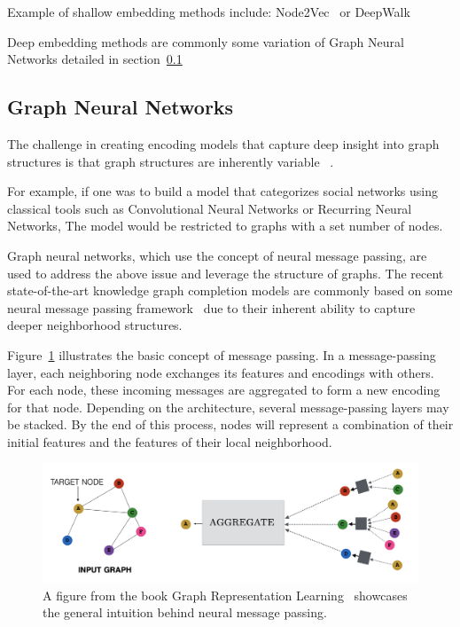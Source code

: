 Example of shallow embedding methods include: Node2Vec~\cite{Node2vec} or DeepWalk~\cite{DeepWalk}

Deep embedding methods are commonly some variation of Graph Neural Networks detailed in section~\ref{subsec:introduction-graph-neural-networks}

\subsection{Graph Neural Networks}\label{subsec:introduction-graph-neural-networks}
The challenge in creating encoding models that capture deep insight into graph structures is that graph structures are inherently variable ~\cite{GRLBook}.

For example, if one was to build a model that categorizes social networks using classical tools such as Convolutional Neural Networks or Recurring Neural Networks,
The model would be restricted to graphs with a set number of nodes.

Graph neural networks, which use the concept of neural message passing, are used to address the above issue and leverage the structure of graphs.
The recent state-of-the-art knowledge graph completion models are commonly based on some neural message passing framework~\cite{LPSOTA} due to their inherent ability to capture
deeper neighborhood structures.

Figure~\ref{fig:gnn} illustrates the basic concept of message passing.
In a message-passing layer, each neighboring node exchanges its features and encodings with others.
For each node, these incoming messages are aggregated to form a new encoding for that node.
Depending on the architecture, several message-passing layers may be stacked.
By the end of this process, nodes will represent a combination of their initial features and the features of their local neighborhood.

\begin{figure}[h] %
    \centering %
    \includegraphics[width=0.9\linewidth]{figures/gnn} %
    \caption{A figure from the book Graph Representation Learning~\cite{GRLBook} showcases the general intuition behind neural message passing.} %
    \label{fig:gnn} %
\end{figure}


